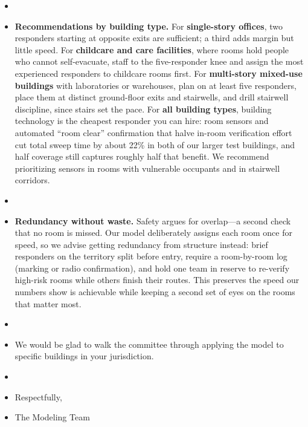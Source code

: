 \documentclass{mcmthesis}
\begin{document}
\begin{itemize}[leftmargin=0em,itemsep=4pt]
\item[]
\item[] \textbf{Recommendations by building type.} For \textbf{single-story offices}, two responders starting at opposite exits are sufficient; a third adds margin but little speed. For \textbf{childcare and care facilities}, where rooms hold people who cannot self-evacuate, staff to the five-responder knee and assign the most experienced responders to childcare rooms first. For \textbf{multi-story mixed-use buildings} with laboratories or warehouses, plan on at least five responders, place them at distinct ground-floor exits and stairwells, and drill stairwell discipline, since stairs set the pace. For \textbf{all building types}, building technology is the cheapest responder you can hire: room sensors and automated ``room clear'' confirmation that halve in-room verification effort cut total sweep time by about 22\% in both of our larger test buildings, and half coverage still captures roughly half that benefit. We recommend prioritizing sensors in rooms with vulnerable occupants and in stairwell corridors.
\item[]
\item[] \textbf{Redundancy without waste.} Safety argues for overlap---a second check that no room is missed. Our model deliberately assigns each room once for speed, so we advise getting redundancy from structure instead: brief responders on the territory split before entry, require a room-by-room log (marking or radio confirmation), and hold one team in reserve to re-verify high-risk rooms while others finish their routes. This preserves the speed our numbers show is achievable while keeping a second set of eyes on the rooms that matter most.
\item[]
\item[] We would be glad to walk the committee through applying the model to specific buildings in your jurisdiction.
\item[]
\item[] Respectfully,
\item[] The Modeling Team
\end{itemize}
\end{document}
